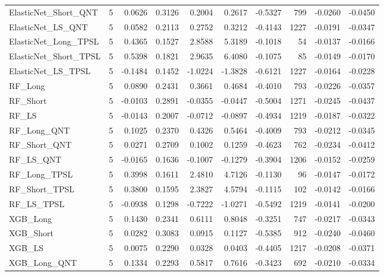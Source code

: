 \begin{tabular}{llrrrrrrrr}
\cline{1-10}
ElasticNet\_Short\_QNT & 5 & 0.0626 & 0.3126 & 0.2004 & 0.2617 & -0.5327 & 799 & -0.0260 & -0.0450 \\
\cline{1-10}
ElasticNet\_LS\_QNT & 5 & 0.0582 & 0.2113 & 0.2752 & 0.3212 & -0.4143 & 1227 & -0.0191 & -0.0347 \\
\cline{1-10}
ElasticNet\_Long\_TPSL & 5 & 0.4365 & 0.1527 & 2.8588 & 5.3189 & -0.1018 & 54 & -0.0137 & -0.0166 \\
\cline{1-10}
ElasticNet\_Short\_TPSL & 5 & 0.5398 & 0.1821 & 2.9635 & 6.4080 & -0.1075 & 85 & -0.0149 & -0.0170 \\
\cline{1-10}
ElasticNet\_LS\_TPSL & 5 & -0.1484 & 0.1452 & -1.0224 & -1.3828 & -0.6121 & 1227 & -0.0164 & -0.0228 \\
\cline{1-10}
RF\_Long & 5 & 0.0890 & 0.2431 & 0.3661 & 0.4684 & -0.4010 & 793 & -0.0226 & -0.0357 \\
\cline{1-10}
RF\_Short & 5 & -0.0103 & 0.2891 & -0.0355 & -0.0447 & -0.5004 & 1271 & -0.0245 & -0.0437 \\
\cline{1-10}
RF\_LS & 5 & -0.0143 & 0.2007 & -0.0712 & -0.0897 & -0.4934 & 1219 & -0.0187 & -0.0322 \\
\cline{1-10}
RF\_Long\_QNT & 5 & 0.1025 & 0.2370 & 0.4326 & 0.5464 & -0.4009 & 793 & -0.0212 & -0.0345 \\
\cline{1-10}
RF\_Short\_QNT & 5 & 0.0271 & 0.2709 & 0.1002 & 0.1259 & -0.4623 & 762 & -0.0234 & -0.0412 \\
\cline{1-10}
RF\_LS\_QNT & 5 & -0.0165 & 0.1636 & -0.1007 & -0.1279 & -0.3904 & 1206 & -0.0152 & -0.0259 \\
\cline{1-10}
RF\_Long\_TPSL & 5 & 0.3998 & 0.1611 & 2.4810 & 4.7126 & -0.1130 & 96 & -0.0147 & -0.0172 \\
\cline{1-10}
RF\_Short\_TPSL & 5 & 0.3800 & 0.1595 & 2.3827 & 4.5794 & -0.1115 & 102 & -0.0142 & -0.0166 \\
\cline{1-10}
RF\_LS\_TPSL & 5 & -0.0938 & 0.1298 & -0.7222 & -1.0271 & -0.5492 & 1219 & -0.0141 & -0.0200 \\
\cline{1-10}
XGB\_Long & 5 & 0.1430 & 0.2341 & 0.6111 & 0.8048 & -0.3251 & 747 & -0.0217 & -0.0343 \\
\cline{1-10}
XGB\_Short & 5 & 0.0282 & 0.3083 & 0.0915 & 0.1127 & -0.5385 & 912 & -0.0240 & -0.0460 \\
\cline{1-10}
XGB\_LS & 5 & 0.0075 & 0.2290 & 0.0328 & 0.0403 & -0.4405 & 1217 & -0.0208 & -0.0371 \\
\cline{1-10}
XGB\_Long\_QNT & 5 & 0.1334 & 0.2293 & 0.5817 & 0.7616 & -0.3423 & 692 & -0.0210 & -0.0334 \\

\end{tabular}
